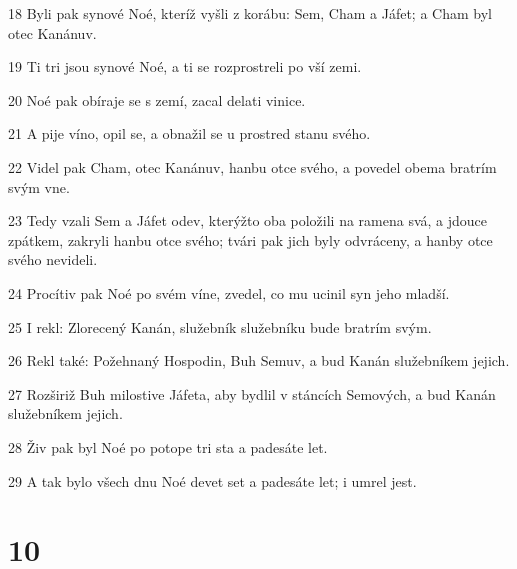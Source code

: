 \par 18 Byli pak synové Noé, kteríž vyšli z korábu: Sem, Cham a Jáfet; a Cham byl otec Kanánuv.
\par 19 Ti tri jsou synové Noé, a ti se rozprostreli po vší zemi.
\par 20 Noé pak obíraje se s zemí, zacal delati vinice.
\par 21 A pije víno, opil se, a obnažil se u prostred stanu svého.
\par 22 Videl pak Cham, otec Kanánuv, hanbu otce svého, a povedel obema bratrím svým vne.
\par 23 Tedy vzali Sem a Jáfet odev, kterýžto oba položili na ramena svá, a jdouce zpátkem, zakryli hanbu otce svého; tvári pak jich byly odvráceny, a hanby otce svého nevideli.
\par 24 Procítiv pak Noé po svém víne, zvedel, co mu ucinil syn jeho mladší.
\par 25 I rekl: Zlorecený Kanán, služebník služebníku bude bratrím svým.
\par 26 Rekl také: Požehnaný Hospodin, Buh Semuv, a bud Kanán služebníkem jejich.
\par 27 Rozširiž Buh milostive Jáfeta, aby bydlil v stáncích Semových, a bud Kanán služebníkem jejich.
\par 28 Živ pak byl Noé po potope tri sta a padesáte let.
\par 29 A tak bylo všech dnu Noé devet set a padesáte let; i umrel jest.

\chapter{10}

